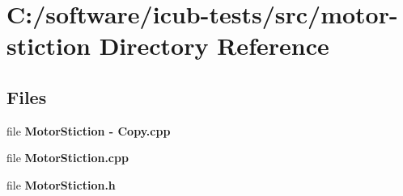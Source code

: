 \section{C\+:/software/icub-\/tests/src/motor-\/stiction Directory Reference}
\label{dir_3b1318bac6af3327e49b6f2c90562c86}
\subsection*{Files}
\begin{DoxyCompactItemize}
\item 
file {\bfseries Motor\+Stiction -\/ Copy.\+cpp}
\item 
file {\bfseries Motor\+Stiction.\+cpp}
\item 
file {\bfseries Motor\+Stiction.\+h}
\end{DoxyCompactItemize}
